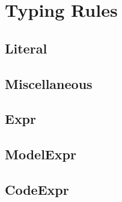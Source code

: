 \documentclass{article}
\begin{document}
\section{Typing Rules}

\subsection{Literal}



\subsection{Miscellaneous}



\subsection{Expr}



\subsection{ModelExpr}



\subsection{CodeExpr}


\end{document}
